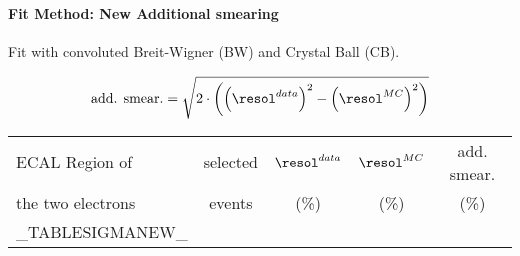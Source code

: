 \color{titlecolor}
\begin{frame}
  \frametitle{\dataSample}
  \framesubtitle{Fit Method: New Additional smearing}

  Fit with convoluted Breit-Wigner (BW) and Crystal Ball (CB).

  $$ \text{add. smear.}  = \sqrt{2 \cdot \left( \left(\resol^{data}\right)^2 - \left(\resol^{MC}\right)^2 \right)}$$

  
  \begin{center}
    \emph{\dataSample}\xspace \invMassVarName

    \begin{tabular}{|l|c|c|c|c|} \hline
      ECAL Region of & selected  & $\resol^{data}$ & $\resol^{MC}$  & add. smear. \\
      the two electrons & events & (\%) & (\%) & (\%) \\
      \hline
      \hline
      _TABLESIGMANEW_
      \hline		
    \end{tabular}
  \end{center}
\end{frame}


